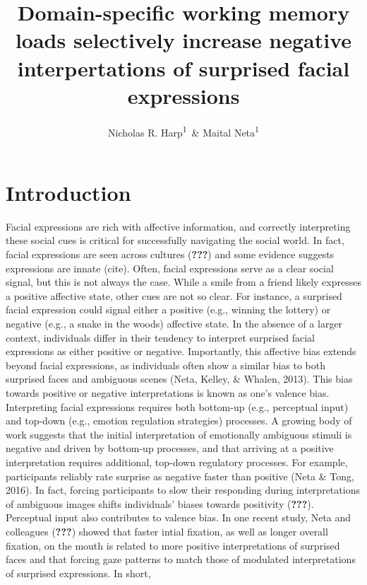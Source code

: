 \documentclass[man]{apa6}
\title{Domain-specific working memory loads selectively increase negative interpertations of surprised facial expressions}
\author{Nicholas R. Harp\textsuperscript{1}~\& Maital Neta\textsuperscript{1}}
\date{}
\affiliation{
\vspace{0.5cm}
\textsuperscript{1} University of Nebraska-Lincoln}
\begin{document}
\maketitle

\hypertarget{introduction}{%
\section{Introduction}\label{introduction}}

Facial expressions are rich with affective information, and correctly interpreting these social cues is critical for successfully navigating the social world. In fact, facial expressions are seen across cultures ({\textbf{???}}) and some evidence suggests expressions are innate (cite). Often, facial expressions serve as a clear social signal, but this is not always the case. While a smile from a friend likely expresses a positive affective state, other cues are not so clear. For instance, a surprised facial expression could signal either a positive (e.g., winning the lottery) or negative (e.g., a snake in the woods) affective state. In the absence of a larger context, individuals differ in their tendency to interpret surprised facial expressions as either positive or negative. Importantly, this affective bias extends beyond facial expressions, as individuals often show a similar bias to both surprised faces and ambiguous scenes (Neta, Kelley, \& Whalen, 2013). This bias towards positive or negative interpretations is known as one's valence bias.
Interpreting facial expressions requires both bottom-up (e.g., perceptual input) and top-down (e.g., emotion regulation strategies) processes. A growing body of work suggests that the initial interpretation of emotionally ambiguous stimuli is negative and driven by bottom-up processes, and that arriving at a positive interpretation requires additional, top-down regulatory processes. For example, participants reliably rate surprise as negative faster than positive (Neta \& Tong, 2016). In fact, forcing participants to slow their responding during interpretations of ambiguous images shifts individuals' biases towards positivity ({\textbf{???}}). Perceptual input also contributes to valence bias. In one recent study, Neta and colleagues ({\textbf{???}}) showed that faster intial fixation, as well as longer overall fixation, on the mouth is related to more positive interpretations of surprised faces and that forcing gaze patterns to match those of modulated interpretations of surprised expressions. In short,\\
\end{document}
